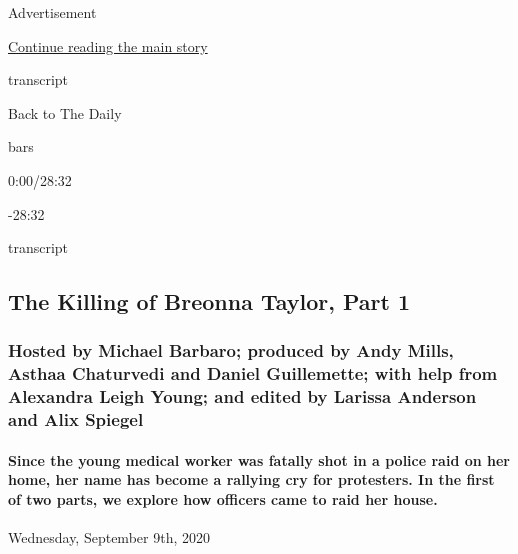 Advertisement

\protect\hyperlink{after-top}{Continue reading the main story}

transcript

Back to The Daily

bars

0:00/28:32

-28:32

transcript

\hypertarget{the-killing-of-breonna-taylor-part-1}{%
\subsection{The Killing of Breonna Taylor, Part
1}\label{the-killing-of-breonna-taylor-part-1}}

\hypertarget{hosted-by-michael-barbaro-produced-by-andy-mills-asthaa-chaturvedi-and-daniel-guillemette-with-help-from-alexandra-leigh-young-and-edited-by-larissa-anderson-and-alix-spiegel}{%
\subsubsection{Hosted by Michael Barbaro; produced by Andy Mills, Asthaa
Chaturvedi and Daniel Guillemette; with help from Alexandra Leigh Young;
and edited by Larissa Anderson and Alix
Spiegel}\label{hosted-by-michael-barbaro-produced-by-andy-mills-asthaa-chaturvedi-and-daniel-guillemette-with-help-from-alexandra-leigh-young-and-edited-by-larissa-anderson-and-alix-spiegel}}

\hypertarget{since-the-young-medical-worker-was-fatally-shot-in-a-police-raid-on-her-home-her-name-has-become-a-rallying-cry-for-protesters-in-the-first-of-two-parts-we-explore-how-officers-came-to-raid-her-house}{%
\paragraph{Since the young medical worker was fatally shot in a police
raid on her home, her name has become a rallying cry for protesters. In
the first of two parts, we explore how officers came to raid her
house.}\label{since-the-young-medical-worker-was-fatally-shot-in-a-police-raid-on-her-home-her-name-has-become-a-rallying-cry-for-protesters-in-the-first-of-two-parts-we-explore-how-officers-came-to-raid-her-house}}

Wednesday, September 9th, 2020

